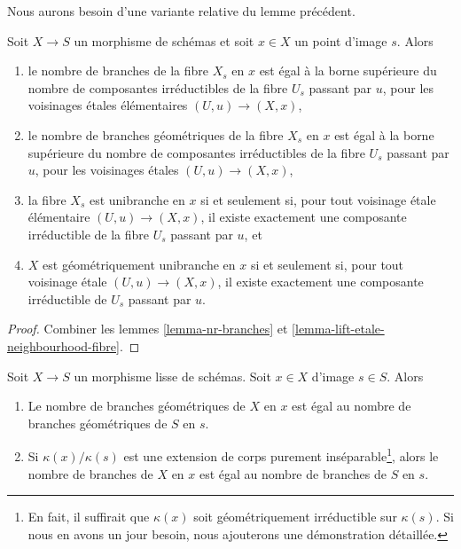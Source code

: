\noindent
Nous aurons besoin d'une variante relative du lemme précédent.

\begin{lemma}
\label{lemma-nr-branches-fibre}
Soit $X \to S$ un morphisme de schémas et soit $x \in X$ un point d'image $s$.
Alors
\begin{enumerate}
\item le nombre de branches de la fibre $X_s$ en $x$ est égal à
la borne supérieure du nombre de composantes irréductibles de la fibre $U_s$
passant par $u$, pour les voisinages \'etales élémentaires
$(U, u) \to (X, x)$,
\item le nombre de branches géométriques de la fibre $X_s$ en $x$ est égal à
la borne supérieure du nombre de composantes irréductibles de la fibre $U_s$
passant par $u$, pour les voisinages \'etales
$(U, u) \to (X, x)$,
\item la fibre $X_s$ est unibranche en $x$ si et seulement si, pour tout
voisinage \'etale élémentaire $(U, u) \to (X, x)$, il existe
exactement une composante irréductible de la fibre $U_s$ passant par $u$, et
\item $X$ est géométriquement unibranche en $x$ si et seulement si, pour tout
voisinage \'etale $(U, u) \to (X, x)$, il existe
exactement une composante irréductible de $U_s$ passant par $u$.
\end{enumerate}
\end{lemma}

\begin{proof}
Combiner les lemmes \ref{lemma-nr-branches} et
\ref{lemma-lift-etale-neighbourhood-fibre}.
\end{proof}

\begin{lemma}
\label{lemma-number-of-branches-and-smooth}
Soit $X \to S$ un morphisme lisse de schémas.
Soit $x \in X$ d'image $s \in S$.
Alors
\begin{enumerate}
\item Le nombre de branches géométriques de $X$ en $x$
est égal au nombre de branches géométriques de $S$ en $s$.
\item Si $\kappa(x)/\kappa(s)$ est une extension de corps purement inséparable\footnote{
En fait, il suffirait que $\kappa(x)$ soit géométriquement
irréductible sur $\kappa(s)$. Si nous en avons un jour besoin, nous ajouterons une démonstration détaillée.},
alors le nombre de branches de $X$ en $x$
est égal au nombre de branches de $S$ en $s$.
\end{enumerate}
\end{lemma}

